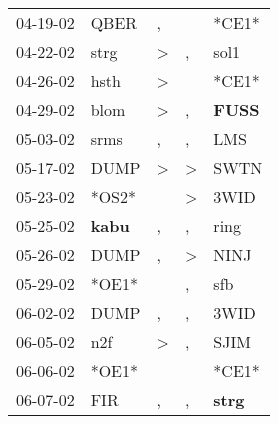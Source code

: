 \begin{supertabular}{p{0.07\textwidth}p{0.06\textwidth}p{0.02\textwidth}p{0.02\textwidth}p{0.06\textwidth}}
          04-19-02\textsuperscript{} &           QBER\textsuperscript{} &                , &                  &                            *CE1* \\
          04-22-02\textsuperscript{} &           strg\textsuperscript{} &     \textgreater &                , &           sol1\textsuperscript{} \\
          04-26-02\textsuperscript{} &           hsth\textsuperscript{} &     \textgreater &                  &                            *CE1* \\
          04-29-02\textsuperscript{} &           blom\textsuperscript{} &     \textgreater &                , &  \textbf{FUSS\textsuperscript{}} \\
          05-03-02\textsuperscript{} &           srms\textsuperscript{} &                , &                , &            LMS\textsuperscript{} \\
          05-17-02\textsuperscript{} &           DUMP\textsuperscript{} &     \textgreater &     \textgreater &           SWTN\textsuperscript{} \\
          05-23-02\textsuperscript{} &                            *OS2* &                  &     \textgreater &           3WID\textsuperscript{} \\
          05-25-02\textsuperscript{} &  \textbf{kabu\textsuperscript{}} &                , &                , &           ring\textsuperscript{} \\
          05-26-02\textsuperscript{} &           DUMP\textsuperscript{} &                , &     \textgreater &           NINJ\textsuperscript{} \\
          05-29-02\textsuperscript{} &                            *OE1* &                  &                , &            sfb\textsuperscript{} \\
          06-02-02\textsuperscript{} &           DUMP\textsuperscript{} &                , &                , &           3WID\textsuperscript{} \\
          06-05-02\textsuperscript{} &            n2f\textsuperscript{} &     \textgreater &                , &           SJIM\textsuperscript{} \\
          06-06-02\textsuperscript{} &                            *OE1* &                  &                  &                            *CE1* \\
          06-07-02\textsuperscript{} &            FIR\textsuperscript{} &                , &                , &  \textbf{strg\textsuperscript{}} \\

\end{supertabular}
